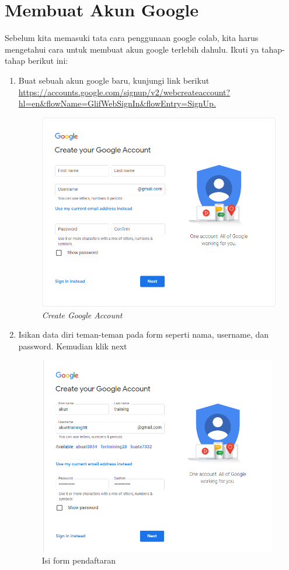 \section{Membuat Akun Google}
Sebelum kita memasuki tata cara penggunaan google colab, kita harus mengetahui cara untuk membuat akun google terlebih dahulu. Ikuti ya tahap-tahap berikut ini:
\begin{enumerate}

\item Buat sebuah akun google baru, kunjungi link berikut \small \url{https://accounts.google.com/signup/v2/webcreateaccount?hl=en&flowName=GlifWebSignIn&flowEntry=SignUp.}
\begin{figure}[H]
    \centering
    \includegraphics[scale=0.5]{figures/google1}
    \caption{\textit{Create Google Account}}
    \label{google1}
\end{figure}

\item Isikan data diri teman-teman pada form seperti nama, username, dan password. Kemudian klik next
\begin{figure}[H]
    \centering
    \includegraphics[scale=0.5]{figures/google2}
    \caption{Isi form pendaftaran}
    \label{google2}
\end{figure}


\end{enumerate}
